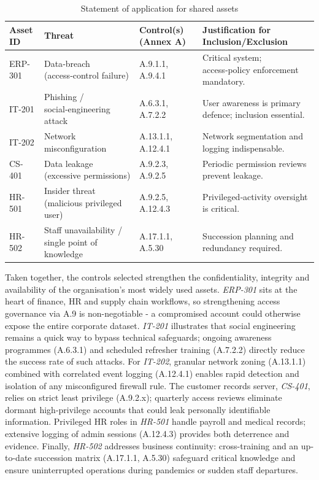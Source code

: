 \begin{longtable}{|p{2cm}|p{4cm}|p{4.5cm}|p{4cm}|}
    \caption{Statement of application for shared assets}                                                                                                            \\
    \hline
    \textbf{Asset ID} & \textbf{Threat}                                  & \textbf{Control(s)\,(Annex A)} & \textbf{Justification for Inclusion/Exclusion}          \\
    \hline
    \endhead
    ERP-301           & Data‑breach (access‑control failure)             & A.9.1.1, A.9.4.1               & Critical system; access‑policy enforcement mandatory.   \\
    \hline
    IT-201            & Phishing / social‑engineering attack             & A.6.3.1, A.7.2.2               & User awareness is primary defence; inclusion essential. \\
    \hline
    IT-202            & Network misconfiguration                         & A.13.1.1, A.12.4.1             & Network segmentation and logging indispensable.         \\
    \hline
    CS-401            & Data leakage (excessive permissions)             & A.9.2.3, A.9.2.5               & Periodic permission reviews prevent leakage.            \\
    \hline
    HR-501            & Insider threat (malicious privileged user)       & A.9.2.5, A.12.4.3              & Privileged‑activity oversight is critical.              \\
    \hline
    HR-502            & Staff unavailability / single point of knowledge & A.17.1.1, A.5.30               & Succession planning and redundancy required.            \\
    \hline
\end{longtable}

Taken together, the controls selected strengthen the confidentiality, integrity and availability of the organisation's
most widely used assets.  \emph{ERP-301} sits at the heart of finance, HR and supply chain workflows, so strengthening
access governance via A.9 is non-negotiable - a compromised account could otherwise expose the entire corporate dataset.
\emph{IT-201} illustrates that social engineering remains a quick way to bypass technical safeguards; ongoing awareness programmes
(A.6.3.1) and scheduled refresher training (A.7.2.2) directly reduce the success rate of such attacks.  For \emph{IT-202},
granular network zoning (A.13.1.1) combined with correlated event logging (A.12.4.1) enables rapid detection and isolation of
any misconfigured firewall rule.  The customer records server, \emph{CS-401}, relies on strict least privilege (A.9.2.x);
quarterly access reviews eliminate dormant high-privilege accounts that could leak personally identifiable information.
Privileged HR roles in \emph{HR-501} handle payroll and medical records; extensive logging of admin sessions (A.12.4.3)
provides both deterrence and evidence.  Finally, \emph{HR-502} addresses business continuity: cross-training and an up-to-date
succession matrix (A.17.1.1, A.5.30) safeguard critical knowledge and ensure uninterrupted operations during pandemics or sudden
staff departures.


